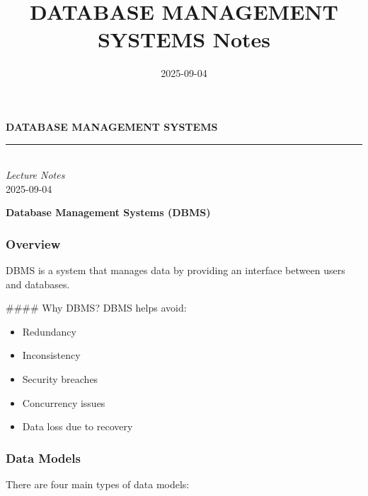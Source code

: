 \documentclass[11pt,letterpaper]{article}
\title{\textcolor{primarycolor}{\Huge\textbf{DATABASE MANAGEMENT SYSTEMS Notes}}}
\author{}
\date{\textcolor{secondarycolor}{2025-09-04}}
\begin{document}
\begin{tcolorbox}[
    enhanced,
    colback=backgroundcolor,
    colframe=primarycolor,
    boxrule=2pt,
    arc=8pt,
    width=\textwidth,
    left=0pt,
    right=0pt,
    top=0pt,
    bottom=0pt
]
    \begin{center}
        \vspace{1.2cm}
        {\fontsize{32}{38}\selectfont\textcolor{primarycolor}{\textbf{DATABASE MANAGEMENT SYSTEMS}}} \\[0.8cm]

        {\color{secondarycolor}\rule{0.6\textwidth}{1.5pt}} \\[0.5cm]

        {\Large\textcolor{secondarycolor!80}{\textit{Lecture Notes}}} \\[0.4cm]

        {\large\textcolor{accentcolor}{\textbullet\hspace{0.3em}2025-09-04\hspace{0.3em}\textbullet}} \\[0.3cm]

        \vspace{1cm}
    \end{center}
\end{tcolorbox}

\vspace{1.5cm}

\textbf{Database Management Systems (DBMS)}

\subsubsection*{Overview}
DBMS is a system that manages data by providing an interface between users and databases.

#### Why DBMS?
DBMS helps avoid:
\begin{itemize}
  \item Redundancy
  \item Inconsistency
  \item Security breaches
  \item Concurrency issues
  \item Data loss due to recovery
\end{itemize}

\subsubsection*{Data Models}
There are four main types of data models:
\end{document}
